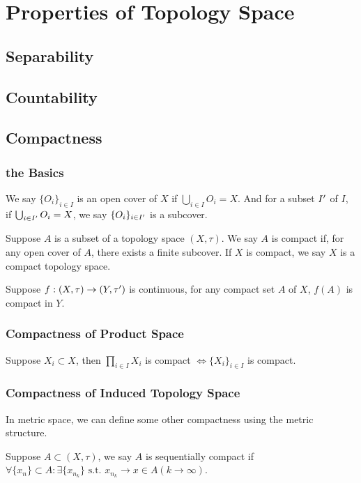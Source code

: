 \section{Properties of Topology Space}
\subsection{Separability}

\subsection{Countability}

\subsection{Compactness}
\subsubsection{the Basics}
We say $\{O_i\}_{i\in I}$ is an open cover of $X$ if $\bigcup_{i\in I} O_i = X$. And for a subset $I^{\prime}$ of $I$, if $\bigcup_{i\in I^{\prime}} O_i = X$, we say $\{O_i\}_{i\in I^{\prime}}$ is a subcover.

\begin{definition}[Compactness]
    Suppose $A$ is a subset of a topology space $(X,\tau)$. We say $A$ is compact if, for any open cover of $A$, there exists a finite subcover. If $X$ is compact, we say $X$ is a compact topology space.
\end{definition}

\begin{theorem}
    Suppose $f : (X,\tau) \to (Y, \tau^{\prime})$ is continuous, for any compact set $A$ of $X$, $f(A)$ is compact in $Y$.
\end{theorem}

\subsubsection{Compactness of Product Space}
\begin{theorem}[Tychonoff]
    Suppose $X_i \subset X$, then $\prod_{i\in I} X_i$ is compact $\iff \{X_i\}_{i\in I}$ is compact.
\end{theorem}

\subsubsection{Compactness of Induced Topology Space}
In metric space, we can define some other compactness using the metric structure.
\begin{definition}
    Suppose $A\subset (X,\tau)$, we say $A$ is sequentially compact if $\forall \{x_n\} \subset A: \exists \{x_{n_k}\} \text{ s.t. } x_{n_k} \to x\in A (k\to \infty)$.
\end{definition}

